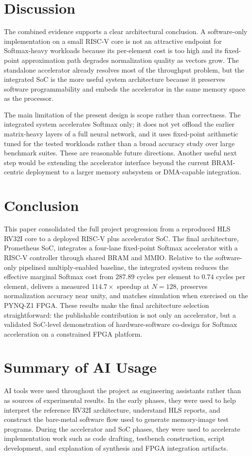 \documentclass[conference]{IEEEtran}
\begin{document}
\section{Discussion}
The combined evidence supports a clear architectural conclusion. A software-only implementation on a small RISC-V core is not an attractive endpoint for Softmax-heavy workloads because its per-element cost is too high and its fixed-point approximation path degrades normalization quality as vectors grow. The standalone accelerator already resolves most of the throughput problem, but the integrated SoC is the more useful system architecture because it preserves software programmability and embeds the accelerator in the same memory space as the processor.

The main limitation of the present design is scope rather than correctness. The integrated system accelerates Softmax only; it does not yet offload the earlier matrix-heavy layers of a full neural network, and it uses fixed-point arithmetic tuned for the tested workloads rather than a broad accuracy study over large benchmark suites. These are reasonable future directions. Another useful next step would be extending the accelerator interface beyond the current BRAM-centric deployment to a larger memory subsystem or DMA-capable integration.

\section{Conclusion}
This paper consolidated the full project progression from a reproduced HLS RV32I core to a deployed RISC-V plus accelerator SoC. The final architecture, Prometheus SoC, integrates a four-lane fixed-point Softmax accelerator with a RISC-V controller through shared BRAM and MMIO. Relative to the software-only pipelined multiply-enabled baseline, the integrated system reduces the effective marginal Softmax cost from $287.89$ cycles per element to $0.74$ cycles per element, delivers a measured $114.7\times$ speedup at $N=128$, preserves normalization accuracy near unity, and matches simulation when exercised on the PYNQ-Z1 FPGA. These results make the final architecture selection straightforward: the publishable contribution is not only an accelerator, but a validated SoC-level demonstration of hardware-software co-design for Softmax acceleration on a constrained FPGA platform.

\appendices
\section{Summary of AI Usage}
AI tools were used throughout the project as engineering assistants rather than as sources of experimental results. In the early phases, they were used to help interpret the reference RV32I architecture, understand HLS reports, and construct the bare-metal software flow used to generate memory-image test programs. During the accelerator and SoC phases, they were used to accelerate implementation work such as code drafting, testbench construction, script development, and explanation of synthesis and FPGA integration artifacts.
\end{document}
